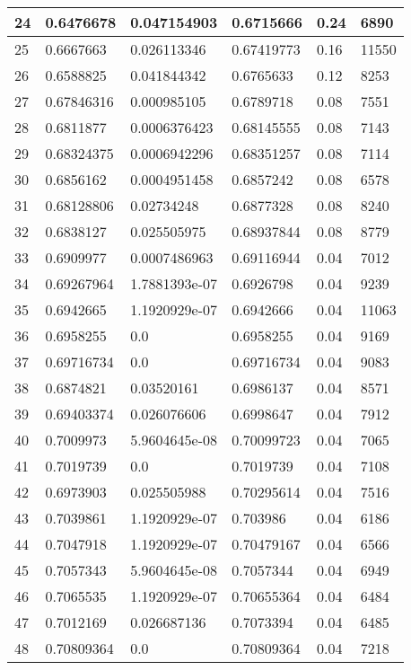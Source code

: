 \begin{longtable}{|l|l|l|l|l|l|}
24 & 0.6476678 & 0.047154903 & 0.6715666 & 0.24 & 6890 \\ \hline 
25 & 0.6667663 & 0.026113346 & 0.67419773 & 0.16 & 11550 \\ \hline 
26 & 0.6588825 & 0.041844342 & 0.6765633 & 0.12 & 8253 \\ \hline 
27 & 0.67846316 & 0.000985105 & 0.6789718 & 0.08 & 7551 \\ \hline 
28 & 0.6811877 & 0.0006376423 & 0.68145555 & 0.08 & 7143 \\ \hline 
29 & 0.68324375 & 0.0006942296 & 0.68351257 & 0.08 & 7114 \\ \hline 
30 & 0.6856162 & 0.0004951458 & 0.6857242 & 0.08 & 6578 \\ \hline 
31 & 0.68128806 & 0.02734248 & 0.6877328 & 0.08 & 8240 \\ \hline 
32 & 0.6838127 & 0.025505975 & 0.68937844 & 0.08 & 8779 \\ \hline 
33 & 0.6909977 & 0.0007486963 & 0.69116944 & 0.04 & 7012 \\ \hline 
34 & 0.69267964 & 1.7881393e-07 & 0.6926798 & 0.04 & 9239 \\ \hline 
35 & 0.6942665 & 1.1920929e-07 & 0.6942666 & 0.04 & 11063 \\ \hline 
36 & 0.6958255 & 0.0 & 0.6958255 & 0.04 & 9169 \\ \hline 
37 & 0.69716734 & 0.0 & 0.69716734 & 0.04 & 9083 \\ \hline 
38 & 0.6874821 & 0.03520161 & 0.6986137 & 0.04 & 8571 \\ \hline 
39 & 0.69403374 & 0.026076606 & 0.6998647 & 0.04 & 7912 \\ \hline 
40 & 0.7009973 & 5.9604645e-08 & 0.70099723 & 0.04 & 7065 \\ \hline 
41 & 0.7019739 & 0.0 & 0.7019739 & 0.04 & 7108 \\ \hline 
42 & 0.6973903 & 0.025505988 & 0.70295614 & 0.04 & 7516 \\ \hline 
43 & 0.7039861 & 1.1920929e-07 & 0.703986 & 0.04 & 6186 \\ \hline 
44 & 0.7047918 & 1.1920929e-07 & 0.70479167 & 0.04 & 6566 \\ \hline 
45 & 0.7057343 & 5.9604645e-08 & 0.7057344 & 0.04 & 6949 \\ \hline 
46 & 0.7065535 & 1.1920929e-07 & 0.70655364 & 0.04 & 6484 \\ \hline 
47 & 0.7012169 & 0.026687136 & 0.7073394 & 0.04 & 6485 \\ \hline 
48 & 0.70809364 & 0.0 & 0.70809364 & 0.04 & 7218 \\ \hline 

\end{longtable}
